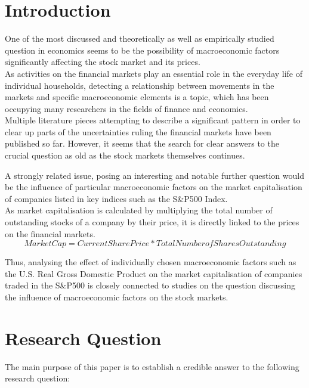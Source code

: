 \documentclass[a4paper,12pt]{article}
\begin{document}
	\clearpage
	\listoftables
	
	\clearpage


 \section{Introduction}
	\vspace{1cm}
One of the most discussed and theoretically as well as empirically studied question in economics seems to be the possibility of macroeconomic factors significantly affecting the stock market and its prices.\\
As activities on the financial markets play an essential role in the everyday life of individual households, detecting a relationship between movements in the markets and specific macroeconomic elements is a topic, which has been occupying many researchers in the fields of finance and economics.\\
Multiple literature pieces attempting to describe a significant pattern in order to clear up parts of the uncertainties ruling the financial markets have been published so far. However, it seems that the search for clear answers to the crucial question as old as the stock markets themselves continues.

\noindent A strongly related issue, posing an interesting and notable further question would be the influence of particular macroeconomic factors on the market capitalisation of companies listed in key indices such as the S\&P500 Index.\\
As market capitalisation is calculated by multiplying the total number of outstanding stocks of a company by their price, it is directly linked to the prices on the financial markets.
\begin{equation}
  Market Cap = Current Share Price * Total Number of Shares Outstanding  
\end{equation}

\noindent Thus, analysing the effect of individually chosen macroeconomic factors such as the U.S. Real Gross Domestic Product on the market capitalisation of companies traded in the S\&P500 is closely connected to studies on the question discussing the influence of macroeconomic factors on the stock markets.

\clearpage
\section{Research Question}

The main purpose of this paper is to establish a credible answer to the following research question:
\end{document}
